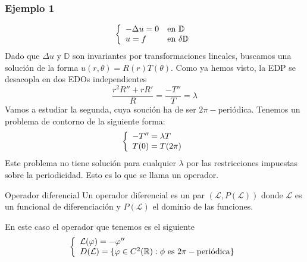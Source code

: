 \subsubsection*{Ejemplo 1}
\begin{equation*}
\left\{
\begin{array}{l l}
-\Delta u = 0 & \text{en } \mathbb{D}\\
u=f & \text{en } \delta \mathbb{D}
\end{array}
\right.
\end{equation*}
Dado que $\Delta u$ y $\mathbb{D}$ son invariantes por transformaciones lineales, buscamos una solución de la forma $u(r,\theta)=R(r)T(\theta)$. Como ya hemos visto, la EDP se desacopla en dos EDOs independientes
$$\frac{r^2R''+rR'}{R} = \frac{-T''}{T} = \lambda$$
Vamos a estudiar la segunda, cuya soución ha de ser $2\pi-$periódica. Tenemos un problema de contorno de la siguiente forma: 
\begin{equation*}
\left\{
\begin{array}{l l}
-T''=\lambda T\\
T(0) = T(2\pi)
\end{array}
\right.
\end{equation*}
Este problema no tiene solución para cualquier $\lambda$ por las restricciones impuestas sobre la periodicidad.
Esto es lo que se llama un operador.
\begin{definition}{Operador diferencial}
Un operador diferencial es un par $(\mathcal{L}, P(\mathcal{L}))$ donde $\mathcal{L}$ es un funcional de diferenciación y $P(\mathcal{L})$ el dominio de las funciones.
\end{definition}
En este caso el operador que tenemos es el siguiente
\begin{equation*}
\left\{
\begin{array}{l l}
\mathcal{L}(\varphi) = -\varphi''\\
D(\mathcal{L}) = \{\varphi\in C^2(\mathbb{R}): \phi \text{ es } 2\pi-\text{periódica}\}
\end{array}
\right.
\end{equation*}

